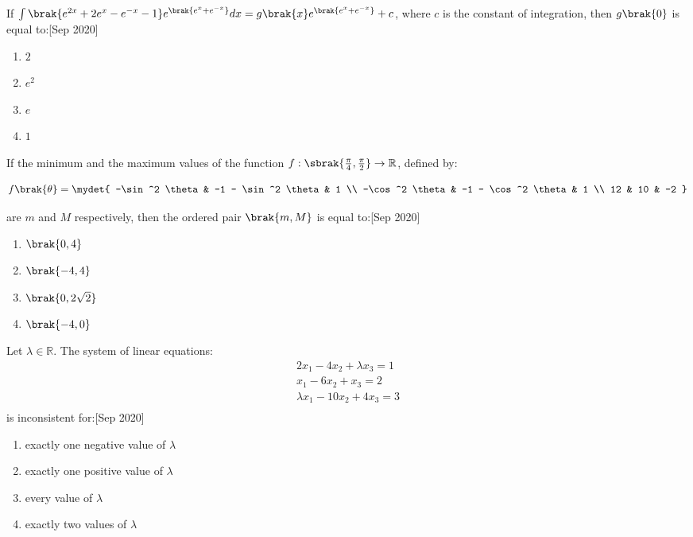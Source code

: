     \item If $\int \brak{e^{2x} + 2e^x - e^{-x} - 1} e^{\brak{e^x + e^{-x}}} dx = g\brak{x} e^{\brak{e^x + e^{-x}}} + c $, where $c$ is the constant of integration, then $g\brak{0}$ is equal to:\hfill{[Sep 2020]}
    \begin{enumerate}
        \item $2$
        \item $e^2$
        \item $e$
        \item $1$
    \end{enumerate}

    \item If the minimum and the maximum values of the function $f : \sbrak{\frac{\pi}{4}, \frac{\pi}{2}} \to \mathbb{R}$, defined by:

    $$
    f\brak{\theta} = \mydet{
    -\sin^2 \theta & -1 - \sin^2 \theta & 1 \\
    -\cos^2 \theta & -1 - \cos^2 \theta & 1 \\
    12 & 10 & -2
    }
    $$
    
    are $m$ and $M$ respectively, then the ordered pair $\brak{m, M}$ is equal to:\hfill{[Sep 2020]}
    
    \begin{enumerate}
        \item $\brak{0, 4}$
        \item $\brak{-4, 4}$
        \item $\brak{0, 2\sqrt{2}}$
        \item $\brak{-4, 0}$
    \end{enumerate}
    

    \item Let $\lambda \in \mathbb{R}$. The system of linear equations:
    \begin{align*}
    2x_1 - 4x_2 + \lambda x_3 = 1\\
    x_1 - 6x_2 + x_3 = 2\\
    \lambda x_1 - 10x_2 + 4x_3 = 3\\
    \end{align*}
    is inconsistent for:\hfill{[Sep 2020]}
    \begin{enumerate}
        \item exactly one negative value of $\lambda$
        \item exactly one positive value of $\lambda$
        \item every value of $\lambda$
        \item exactly two values of $\lambda$
    \end{enumerate}

